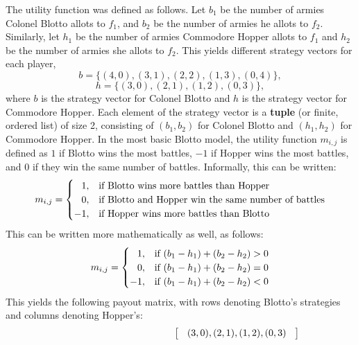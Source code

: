 \documentclass[11pt]{article}
\begin{document}
The utility function was defined as follows. Let $b_1$ be the number of
armies Colonel Blotto allots to $f_1$, and $b_2$ be the number of
armies he allots to $f_2$. Similarly, let $h_1$ be the number of armies
Commodore Hopper allots to $f_1$ and $h_2$ be the number of armies she
allots to $f_2$. This yields different strategy vectors for each
player,
\begin{equation}\label{eq:bstrats1}
b = \{(4,0), (3,1), (2,2), (1,3), (0,4)\},
\end{equation}
\begin{equation}\label{eq:bstrats2}
h = \{(3,0), (2,1), (1,2), (0,3)\},
\end{equation}
where $b$ is the strategy vector for Colonel Blotto and $h$ is the
strategy vector for Commodore Hopper. Each element of the strategy
vector is a \textbf{tuple} (or finite, ordered list) of size 2,
consisting of $(b_1, b_2)$ for Colonel Blotto and $(h_1,h_2)$ for
Commodore Hopper. In the most basic Blotto model, the utility function
$m_{i,j}$ is defined as $1$ if Blotto wins the most battles, $-1$ if Hopper
wins the most battles, and 0 if they win the same number of
battles. Informally, this can be written:
\begin{equation*}
m_{i,j} = \begin{cases}
\hphantom{-}1, & \text{if Blotto wins more battles than Hopper}\\
\hphantom{-}0, & \text{if Blotto and Hopper win the same number of battles}\\
-1, & \text{if Hopper wins more battles than Blotto}
\end{cases}
\end{equation*}
This can be written more mathematically as well, as follows:
\begin{equation*}
m_{i,j} = \begin{cases}
\hphantom{-}1, & \text{if } (b_1-h_1)+(b_2-h_2)>0\\
\hphantom{-}0, & \text{if } (b_1-h_1)+(b_2-h_2)=0\\
-1, & \text{if } (b_1-h_1)+(b_2-h_2)<0
\end{cases}
\end{equation*}
This yields the following payout matrix, with rows denoting Blotto's
strategies and columns denoting Hopper's:
\begin{align*}
\setlength\arraycolsep{9pt}
\hphantom{++++++++++++}\left[{\begin{array}{cccc}
(3,0), (2,1), (1,2), (0,3) \\
\end{array} } \right]
\end{align*}
\end{document}
